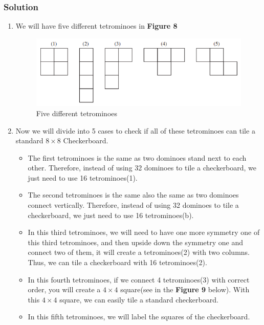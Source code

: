 \documentclass{article}
\begin{document}
\subsubsection*{Solution}
\begin{enumerate} [label = (\alph*)]
    \item We will have five different tetrominoes in \textbf{Figure 8}
    \begin{figure}
        \begin{center}
            \includegraphics*{5dominoes.png}
            \caption{Five different tetrominoes}
        \end{center}
    \end{figure}
    \item Now we will divide into 5 cases to check if all of these
    tetrominoes can tile a standard $ 8 \times 8 $ Checkerboard.
    \begin{itemize}
        \item The first tetrominoes is the same as two dominoes stand next
        to each other. Therefore, instead of using 32 dominoes to tile
        a checkerboard, we just need to use 16 tetrominoes(1).
        \item The second tetrominoes is the same also the same as
        two dominoes connect vertically. Therefore, instead of using
        32 dominoes to tile a checkerboard, we just need to use 16 tetrominoes(b).
        \item In this third tetrominoes, we will need to have one more symmetry one
        of this third tetrominoes, and then upside down the symmetry one and connect
        two of them, it will create a tetrominoes(2) with two columns. Thus,
        we can tile a checkerboard with 16 tetrominoes(2).
        \item In this fourth tetrominoes, if we connect 4 tetrominoes(3)
        with correct order, you will create a $ 4 \times 4 $ square(see in the \textbf{Figure 9} below).
        With this $ 4 \times 4 $ square, we can easily tile a standard checkerboard.
        \item In this fifth tetrominoes, we will label the squares of the checkerboard.

\end{itemize}
\end{enumerate}
\end{document}
